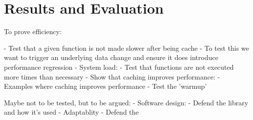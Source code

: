 \chapter{Results and Evaluation}
\label{chapter:results}

To prove efficiency:

- Test that a given function is not made slower after being cache
  - To test this we want to trigger an underlying data change and ensure it does
    introduce performance regression
- System load:
  - Test that functions are not executed more times than necessary
- Show that caching improves performance:
  - Examples where caching improves performance
- Test the 'warmup'

Maybe not to be tested, but to be argued:
- Software design:
  - Defend the library and how it's used
- Adaptablity
  - Defend the


